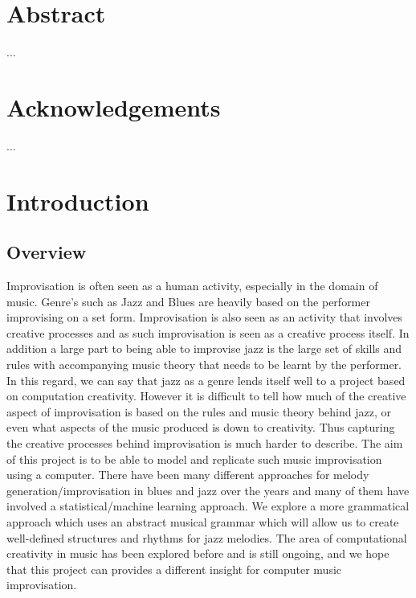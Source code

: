 \documentclass[pdftex,12pt,a4paper]{report}
\begin{document}


\chapter*{Abstract}%
%
...
\chapter*{Acknowledgements}%
%
...


\setcounter{tocdepth}{2} %

\tableofcontents

\pagebreak

\renewcommand*\thesection{\arabic{section}}
 
\pagebreak

\chapter{Introduction}

\section{Overview}
Improvisation is often seen as a human activity, especially in the domain of music. Genre's such as Jazz and Blues are heavily based on the performer improvising on a set form. Improvisation is also seen as an activity that involves creative processes and as such improvisation is seen as a creative process itself. In addition a large part to being able to improvise jazz is the large set of skills and rules with accompanying music theory that needs to be learnt by the performer. In this regard, we can say that jazz as a genre lends itself well to a project based on computation creativity. However it is difficult to tell how much of the creative aspect of improvisation is based on the rules and music theory behind jazz, or even what aspects of the music produced is down to creativity. Thus capturing the creative processes behind improvisation is much harder to describe. The aim of this project is to be able to model and replicate such music improvisation using a computer. There have been many different approaches for melody generation/improvisation in blues and jazz over the years and many of them have involved a statistical/machine learning approach. We explore a more grammatical approach which uses an abstract musical grammar which will allow us to create well-defined structures and rhythms for jazz melodies. The area of computational creativity in music has been explored before and is still ongoing, and we hope that this project can provides a different insight for computer music improvisation. 
\end{document}
